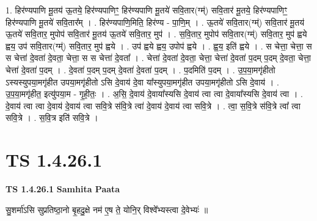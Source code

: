 \documentclass[17pt]{extarticle}
\begin{document}
1. हिर॑ण्यपाणि मू॒तय॑ ऊ॒तये॒ हिर॑ण्यपाणिꣳ॒॒ हिर॑ण्यपाणि मू॒तये॑ सवि॒तार(ग्म्॑) सवि॒तार॑ मू॒तये॒ हिर॑ण्यपाणिꣳ॒॒ हिर॑ण्यपाणि मू॒तये॑ सवि॒तार᳚म् । . हिर॑ण्यपाणि॒मिति॒ हिर॑ण्य - पा॒णि॒म् । . ऊ॒तये॑ सवि॒तार(ग्म्॑) सवि॒तार॑ मू॒तय॑ ऊ॒तये॑ सवि॒तार॒ मुपोप॑ सवि॒तार॑ मू॒तय॑ ऊ॒तये॑ सवि॒तार॒ मुप॑ । . स॒वि॒तार॒ मुपोप॑ सवि॒तार(ग्म्॑) सवि॒तार॒ मुप॑ ह्वये ह्वय॒ उप॑ सवि॒तार(ग्म्॑) सवि॒तार॒ मुप॑ ह्वये । . उप॑ ह्वये ह्वय॒ उपोप॑ ह्वये । . ह्व॒य॒ इति॑ ह्वये । . स चेत्ता॒ चेत्ता॒ स स चेत्ता॑ दे॒वता॑ दे॒वता॒ चेत्ता॒ स स चेत्ता॑ दे॒वता᳚ । . चेत्ता॑ दे॒वता॑ दे॒वता॒ चेत्ता॒ चेत्ता॑ दे॒वता॑ प॒दम् प॒दम् दे॒वता॒ चेत्ता॒ चेत्ता॑ दे॒वता॑ प॒दम् । . दे॒वता॑ प॒दम् प॒दम् दे॒वता॑ दे॒वता॑ प॒दम् । . प॒दमिति॑ प॒दम् । . उ॒प॒या॒मगृ॑हीतो ऽस्यस्युपया॒मगृ॑हीत उपया॒मगृ॑हीतो ऽसि दे॒वाय॑ दे॒वा या᳚स्युपया॒मगृ॑हीत उपया॒मगृ॑हीतो ऽसि दे॒वाय॑ । . उ॒प॒या॒मगृ॑हीत॒ इत्यु॑पया॒म - गृ॒ही॒तः॒ । . अ॒सि॒ दे॒वाय॑ दे॒वाया᳚स्यसि दे॒वाय॑ त्वा त्वा दे॒वाया᳚स्यसि दे॒वाय॑ त्वा । . दे॒वाय॑ त्वा त्वा दे॒वाय॑ दे॒वाय॑ त्वा सवि॒त्रे स॑वि॒त्रे त्वा॑ दे॒वाय॑ दे॒वाय॑ त्वा सवि॒त्रे । . त्वा॒ स॒वि॒त्रे स॑वि॒त्रे त्वा᳚ त्वा सवि॒त्रे । . स॒वि॒त्र इति॑ सवि॒त्रे । \newline
\pagebreak
{}
\section*{ TS 1.4.26.1 }

\textbf{TS 1.4.26.1 } \newline
\textbf{Samhita Paata} \newline

सु॒शर्मा॑ऽसि सुप्रतिष्ठा॒नो बृ॒हदु॒क्षे नम॑ ए॒ष ते॒ योनि॒र् विश्वे᳚भ्यस्त्वा दे॒वेभ्यः॑ ॥ \newline
\end{document}

